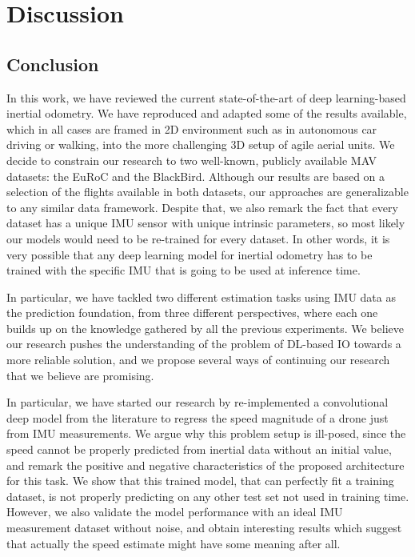 \chapter{Discussion}\label{chap:discussion}

\section{Conclusion}\label{sec:conclusion}

In this work, we have reviewed the current state-of-the-art of deep learning-based inertial odometry.
We have reproduced and adapted some of the results available, which in all cases are framed in 2D environment such as in autonomous car driving or walking, into the more challenging 3D setup of agile aerial units. 
We decide to constrain our research to two well-known, publicly available MAV datasets: the EuRoC and the BlackBird.
Although our results are based on a selection of the flights available in both datasets, our approaches are generalizable to any similar data framework.
Despite that, we also remark the fact that every dataset has a unique IMU sensor with unique intrinsic parameters, so most likely our models would need to be re-trained for every dataset.
In other words, it is very possible that any deep learning model for inertial odometry has to be trained with the specific IMU that is going to be used at inference time. 

In particular, we have tackled two different estimation tasks using IMU data as the prediction foundation, from three different perspectives, where each one builds up on the knowledge gathered by all the previous experiments.
We believe our research pushes the understanding of the problem of DL-based IO towards a more reliable solution, and we propose several ways of continuing our research that we believe are promising.

In particular, we have started our research by re-implemented a convolutional deep model from the literature to regress the speed magnitude of a drone just from IMU measurements.
We argue why this problem setup is ill-posed, since the speed cannot be properly predicted from inertial data without an initial value, and remark the positive and negative characteristics of the proposed architecture for this task.
We show that this trained model, that can perfectly fit a training dataset, is not properly predicting on any other test set not used in training time.
However, we also validate the model performance with an ideal IMU measurement dataset without noise, and obtain interesting results which suggest that actually the speed estimate might have some meaning after all.

